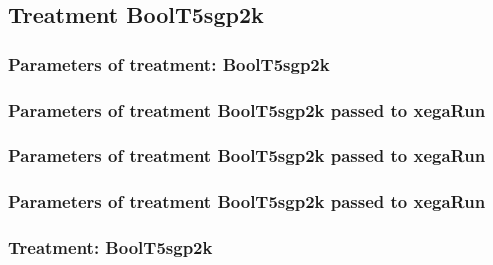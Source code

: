 \documentclass[18pt,c]{beamer}
\begin{document}
\clearpage
\subsection{Treatment BoolT5sgp2k}

 \begin{frame}
 \fontsize{8pt}{9pt}\selectfont
 \frametitle{  Parameters of treatment: BoolT5sgp2k 
 }

 \label{ExpFtParmTable012.tex}  
 \end{frame}


 \begin{frame}
 \fontsize{8pt}{9pt}\selectfont
 \frametitle{  Parameters of treatment BoolT5sgp2k passed to xegaRun
 }

 \label{ExpFtParmTable013.tex}  
 \end{frame}


 \begin{frame}
 \fontsize{8pt}{9pt}\selectfont
 \frametitle{  Parameters of treatment BoolT5sgp2k passed to xegaRun
 }

 \label{ExpFtParmTable014.tex}  
 \end{frame}


 \begin{frame}
 \fontsize{8pt}{9pt}\selectfont
 \frametitle{  Parameters of treatment BoolT5sgp2k passed to xegaRun
 }

 \label{ExpFtParmTable015.tex}  
 \end{frame}

 \begin{frame}
 \fontsize{8pt}{9pt}\selectfont
 \frametitle{ Treatment: BoolT5sgp2k }

 \label{ExpFStatsTable006.tex}  
 \end{frame}
\end{document}
